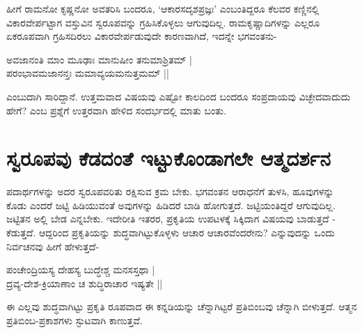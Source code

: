 ಹೀಗೆ ರಾಮನೋ ಕೃಷ್ಣನೋ ಅವತರಿಸಿ ಬಂದರೂ, `ಆಕಾರಸದೃಶಪ್ರಜ್ಞಃ'\label{139a} ಎಂಬಂತಿದ್ದರೂ ಕೆಲವರ ಕಣ್ಣಿನಲ್ಲಿ ವಿಕಾರವೇರ್ಪಟ್ಟಾಗ ವಸ್ತುವಿನ ಸ್ವರೂಪವನ್ನು ಗ್ರಹಿಸಿಕೊಳ್ಳಲು ಆಗುವುದಿಲ್ಲ. ರಾಮಕೃಷ್ಣಾದಿಗಳನ್ನು ಎಲ್ಲರೂ ಏಕರೂಪವಾಗಿ ಗ್ರಹಿಸದಿರಲು ವಿಕಾರವೇರ್ಪಡುವುದೇ ಕಾರಣವಾಗಿದೆ, ಇದನ್ನೇ ಭಗವಂತನು-

\begin{shloka}
ಅವಜಾನಂತಿ ಮಾಂ ಮೂಢಾಃ ಮಾನುಷೀಂ ತನುಮಾಶ್ರಿತಮ್ |\label{139}\\
ಪರಂಭಾವಮಜಾನನ್ತಃ ಮಮಾವ್ಯಯಮನುತ್ತಮಮ್ ||
\end{shloka}

ಎಂಬುದಾಗಿ ಸಾರಿದ್ದಾನೆ. ಉತ್ತಮವಾದ ವಿಷಯವು ಎಷ್ಟೋ ಕಾಲದಿಂದ ಬಂದರೂ ಸಂಪ್ರದಾಯವು ವಿಚ್ಛೇದವಾದುದು ಹೇಗೆ? ಎಂಬ ಪ್ರಶ್ನೆಗೆ ಉತ್ತರವಾಗಿ ಹೇಳಿದ ಸಂದರ್ಭದಲ್ಲಿ ಮಾತು ಬಂತು.

\section*{ಸ್ವರೂಪವು ಕೆಡದಂತೆ ಇಟ್ಟುಕೊಂಡಾಗಲೇ ಆತ್ಮದರ್ಶನ}

ಪದಾರ್ಥಗಳನ್ನು ಅದರ ಸ್ವರೂಪವರಿತು ರಕ್ಷಿಸುವ ಕ್ರಮ ಬೇಕು. ಭಗವಂತನ ಆರಾಧನೆಗೆ ತುಳಸಿ, ಹೂವುಗಳನ್ನು ಕೊಡು ಎಂದರೆ ಜಟ್ಟಿ ಹಿಡಿಯುವಂತೆ ಅವುಗಳನ್ನು ಹಿಡಿದರೆ ಬಾಡಿ ಹೋಗುತ್ತದೆ. ಜಟ್ಟಿಯಂತಿದ್ದರೆ ಆಗುವುದಿಲ್ಲ. ಜಟ್ಟಿತನ ಅಲ್ಲಿ ಬೇಡ ಎನ್ನಬೇಕು. ಇದೇರೀತಿ ಇತರರ, ಪ್ರಕೃತಿಯ ಉಪಟಳಕ್ಕೆ ಸಿಕ್ಕಿದಾಗ ವಿಷಯವು ಬಾಡುತ್ತದೆ - ಕೆಡುತ್ತದೆ. ಆದ್ದರಿಂದ ಪ್ರಕೃತಿಯನ್ನು ಶುದ್ಧವಾಗಿಟ್ಟುಕೊಳ್ಳಳು ಆಚಾರ ಆಚಾರವೆಂದರೇನು? ಎನ್ನುವುದನ್ನು ಒಂದು ನಿರ್ವಚನವು ಹೀಗೆ ಹೇಳುತ್ತದೆ-

\begin{shloka}
ಪಂಚೇಂದ್ರಿಯಸ್ಯ ದೇಹಸ್ಯ ಬುದ್ಧೇಶ್ಚ ಮನಸಸ್ತಥಾ |\label{139b}\\
ದ್ರವ್ಯ-ದೇಶ-ಕ್ರಿಯಾಣಾಂ ಚ ಶುದ್ಧಿರಾಚಾರ ಇಷ್ಯತೇ ||
\end{shloka}

ಈ ಎಲ್ಲವು ಶುದ್ಧವಾಗಿಟ್ಟು ಪ್ರಕೃತಿ ರೂಪವಾದ ಈ ಕನ್ನಡಿಯನ್ನು ಚೆನ್ನಾಗಿಟ್ಟರೆ ಪ್ರತಿಬಿಂಬವು ಚೆನ್ನಾಗಿ ಬೀಳುತ್ತದೆ. ಆತ್ಮನ ಪ್ರತಿಬಿಂಬ-ಪ್ರಕಾಶಗಳು ಸ್ಫುಟವಾಗಿ ಕಾಣುತ್ತವೆ.

